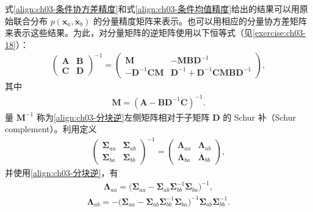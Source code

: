 \documentclass[../../main.tex]{subfiles}
\begin{document}
式\eqref{align:ch03-条件协方差精度}和式\eqref{align:ch03-条件均值精度}给出的结果可以用原始联合分布 $p(\boldsymbol{x}_{a},\boldsymbol{x}_{b})$ 的分量精度矩阵来表示。也可以用相应的分量协方差矩阵来表示这些结果。为此，对分量矩阵的逆矩阵使用以下恒等式（见\cref{exercise:ch03-18}）：
\begin{align}
\begin{pmatrix}\boldsymbol{A} & \boldsymbol{B}\\ \boldsymbol{C} & \boldsymbol{D}\end{pmatrix}^{-1}=\begin{pmatrix}\boldsymbol{M} & -\boldsymbol{M}\boldsymbol{B}\boldsymbol{D}^{-1}\\ -\boldsymbol{D}^{-1}\boldsymbol{C}\boldsymbol{M} & \boldsymbol{D}^{-1}+\boldsymbol{D}^{-1}\boldsymbol{C}\boldsymbol{M}\boldsymbol{B}\boldsymbol{D}^{-1}\end{pmatrix},
\label{align:ch03-分块逆}
\end{align}
其中
\begin{align}
\boldsymbol{M}=(\boldsymbol{A}-\boldsymbol{B}\boldsymbol{D}^{-1}\boldsymbol{C})^{-1}.
\label{align:ch03-舒尔补}
\end{align}
量 $\boldsymbol{M}^{-1}$ 称为\eqref{align:ch03-分块逆}左侧矩阵相对于子矩阵 $\boldsymbol{D}$ 的 Schur 补（Schur complement）。利用定义
\begin{align}
\begin{pmatrix}\boldsymbol{\Sigma}_{aa} & \boldsymbol{\Sigma}_{ab}\\ \boldsymbol{\Sigma}_{ba} & \boldsymbol{\Sigma}_{bb}\end{pmatrix}^{-1}=\begin{pmatrix}\boldsymbol{\Lambda}_{aa} & \boldsymbol{\Lambda}_{ab}\\ \boldsymbol{\Lambda}_{ba} & \boldsymbol{\Lambda}_{bb}\end{pmatrix},
\label{align:ch03-分块逆对应}
\end{align}
并使用\eqref{align:ch03-分块逆}，有
\begin{align}
\boldsymbol{\Lambda}_{aa}=\bigl(\boldsymbol{\Sigma}_{aa}-\boldsymbol{\Sigma}_{ab}\boldsymbol{\Sigma}_{bb}^{-1}\boldsymbol{\Sigma}_{ba}\bigr)^{-1},
\label{align:ch03-精度分块aa}
\end{align}
\begin{align}
\boldsymbol{\Lambda}_{ab}=-\bigl(\boldsymbol{\Sigma}_{aa}-\boldsymbol{\Sigma}_{ab}\boldsymbol{\Sigma}_{bb}^{-1}\boldsymbol{\Sigma}_{ba}\bigr)^{-1}\boldsymbol{\Sigma}_{ab}\boldsymbol{\Sigma}_{bb}^{-1}.
\label{align:ch03-精度分块ab}
\end{align}
\end{document}
